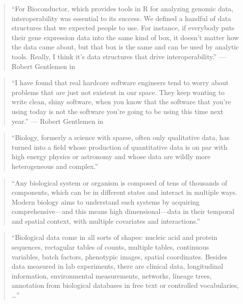 \documentclass[]{tufte-book}
\begin{document}
\begin{quote}
``For Bioconductor, which provides tools in R for analyzing genomic data,
interoperability was essential to its success. We defined a handful of data
structures that we expected people to use. For instance, if everybody puts their
gene expression data into the same kind of box, it doesn't matter how the data
came about, but that box is the same and can be used by analytic tools. Really,
I think it's data structures that drive interoperability.'' --- Robert Gentlemen
in \citep{altschul2013anatomy}
\end{quote}

\begin{quote}
``I have found that real hardcore software engineers tend to worry about
problems that are just not existent in our space. They keep wanting to write
clean, shiny software, when you know that the software that you're using today
is not the software you're going to be using this time next year.'' --- Robert
Gentlemen in \citep{altschul2013anatomy}
\end{quote}

\begin{quote}
``Biology, formerly a science with sparse, often only qualitative data, has
turned into a field whose production of quantitative data is on par with high
energy physics or astronomy and whose data are wildly more heterogeneous and
complex.'' \citep{holmes2018modern}
\end{quote}

\begin{quote}
``Any biological system or organism is composed of tens of thousands of
components, which can be in different states and interact in multiple ways.
Modern biology aims to understand such systems by acquiring comprehensive---and
this means high dimensional---data in their temporal and spatial context, with
multiple covariates and interactions.'' \citep{holmes2018modern}
\end{quote}

\begin{quote}
``Biological data come in all sorts of shapes: nucleic acid and protein sequences,
rectagular tables of counts, multiple tables, continuous variables, batch factors,
phenotypic images, spatial coordinates. Besides data measured in lab experiments,
there are clinical data, longitudinal information, environmental measurements,
networks, lineage trees, annotation from biological databases in free text or
controlled vocabularies, \ldots{}'' \citep{holmes2018modern}
\end{quote}
\end{document}
